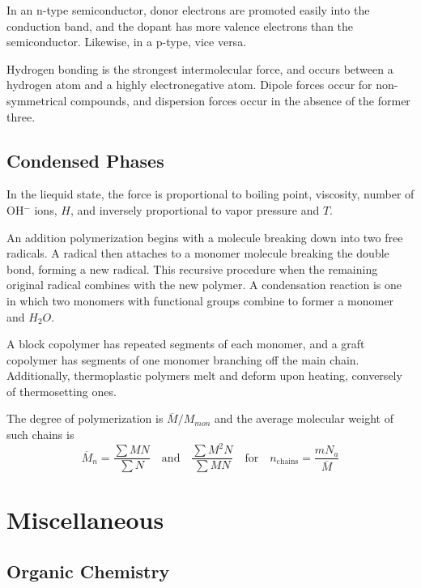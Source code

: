 \documentclass{tufte-book}
\begin{document}
\bigskip
In an n-type semiconductor, donor electrons are promoted easily into the conduction band, and the dopant has more valence electrons than the semiconductor. Likewise, in a p-type, vice versa.

\bigskip
Hydrogen bonding is the strongest intermolecular force, and occurs between a hydrogen atom and a highly electronegative atom. Dipole forces occur for non-symmetrical compounds, and dispersion forces occur in the absence of the former three.

\section{Condensed Phases}
In the liequid state, the force is proportional to boiling point, viscosity, number of OH$^-$ ions, $H$, and inversely proportional to vapor pressure and $T$.

\bigskip
An addition polymerization begins with a molecule breaking down into two free radicals. A radical then attaches to a monomer molecule breaking the double bond, forming a new radical. This recursive procedure when the remaining original radical combines with the new polymer. A condensation reaction is one in which two monomers with functional groups combine to former a monomer and $H_2O$.

\bigskip
A block copolymer has repeated segments of each monomer, and a graft copolymer has segments of one monomer branching off the main chain. Additionally, thermoplastic polymers melt and deform upon heating, conversely of thermosetting ones.

\bigskip
The degree of polymerization is $\overline M / M_{mon}$ and the average molecular weight of such chains is \begin{equation}
  \overline M_n = \frac{\sum MN}{\sum N} \quad\text{and}\quad \frac{\sum M^2 N}{\sum MN} \quad\text{for}\quad n_{\mathrm{chains}} = \frac{m N_a}{\overline M}
\end{equation}

\chapter{Miscellaneous}

\section{Organic Chemistry}
\end{document}
